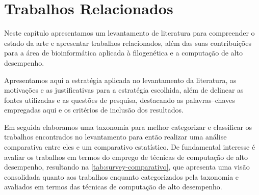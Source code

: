 \documentclass[english,brazilian]{UNISINOSmonografia} %
\begin{document}
\chapter{Trabalhos Relacionados}
\label{ch:relacionados}







Neste capítulo apresentamos um levantamento de literatura para compreender o estado da arte e apresentar trabalhos relacionados, além das suas contribuições para a área de bioinformática aplicada à filogenética e a computação de alto desempenho.


Apresentamos aqui a estratégia aplicada no levantamento da literatura, as motivações e as justificativas para a estratégia escolhida, além de delinear as fontes utilizadas e as questões de pesquisa, destacando as palavras--chaves empregadas aqui e os critérios de inclusão dos resultados.


Em seguida elaboramos uma taxonomia para melhor categorizar e classificar os trabalhos encontrados no levantamento para então realizar uma análise comparativa entre eles e um comparativo estatístico. De fundamental interesse é avaliar os trabalhos em termos do emprego de técnicas de computação de alto desempenho, resultando na \autoref{tab:survey-comparativo}, que apresenta uma visão consolidada quanto aos trabalhos enquanto categorizados pela taxonomia e avaliados em termos das técnicas de computação de alto desempenho.
\end{document}
